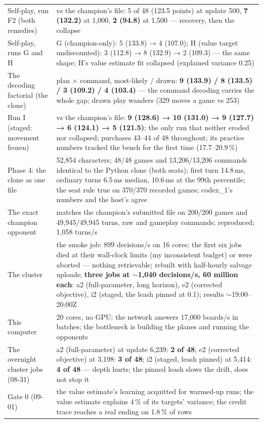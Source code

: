 \documentclass[11pt,a4paper]{article}
\begin{document}
\begin{small}
\begin{longtable}{@{}L{7.4cm}L{8.0cm}@{}}
Self-play, run F2 (both remedies) & vs the champion's file: 5 of 48 (123.5 points) at update 500, \textbf{7 (132.2)} at 1,000, \textbf{2 (94.8)} at 1,500 --- recovery, then the collapse \\
Self-play, runs G and H & G (champion-only): 5 (133.8) → 4 (107.0); H (value target undiscounted): 3 (112.8) → 8 (132.9) → 2 (109.3) --- the same shape; H's value estimate fit collapsed (explained variance 0.25) \\
The decoding factorial (the clone) & plan × command, most-likely / drawn: \textbf{9 (133.9) / 8 (133.5) / 3 (109.2) / 4 (103.4)} --- the command decoding carries the whole gap; drawn play wanders (329 moves a game vs 253) \\
Run I (staged: movement frozen) & vs the champion's file: \textbf{9 (128.6) → 10 (131.0) → 9 (127.7) → 6 (124.1) → 5 (121.5)}; the only run that neither eroded nor collapsed; purchases 43--44 of 48 throughout; its practice numbers tracked the bench for the first time (17.7--20.9\,\%) \\
Phase 4: the clone as one file & 52,854 characters; 48/48 games and 13,206/13,206 commands identical to the Python clone (both seats); first turn 14.8\,ms, ordinary turns 6.5\,ms median, 10.6\,ms at the 99th percentile; the seat rule true on 370/370 recorded games; codex\_1's numbers and the host's agree \\
The exact champion opponent & matches the champion's submitted file on 200/200 games and 49,945/49,945 turns, raw and gameplay commands; reproduced; 1,058 turns/s \\
The cluster & the smoke job: 899 decisions/s on 16 cores; the first six jobs died at their wall-clock limits (my inconsistent budget) or were aborted --- nothing retrievable; rebuilt with half-hourly salvage uploads; \textbf{three jobs at $\sim$1,040 decisions/s, 60 million each}: a2 (full-parameter, long horizon), e2 (corrected objective), i2 (staged, the leash pinned at 0.1); results $\sim$19:00--20:00Z \\
This computer & 20 cores, no GPU: the network answers 17,000 boards/s in batches; the bottleneck is building the planes and running the opponents \\
\midrule
The overnight cluster jobs (08-31) & a2 (full-parameter) at update 6,239: \textbf{2 of 48}; e2 (corrected objective) at 3,198: \textbf{3 of 48}; i2 (staged, leash pinned) at 5,414: \textbf{4 of 48} --- depth hurts; the pinned leash slows the drift, does not stop it \\
Gate 0 (09-01) & the value estimate's learning acquitted for warmed-up runs; the value estimate explains 4\,\% of its targets' variance; the credit trace reaches a real ending on 1.8\,\% of rows \\

\end{longtable}
\end{small}
\end{document}
